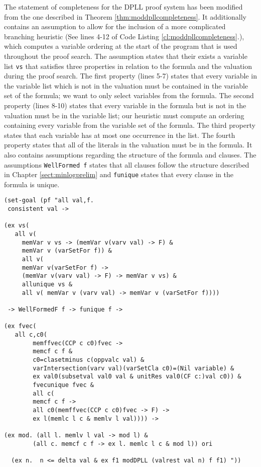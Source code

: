 The statement of completeness for the DPLL proof system has been modified from the one described in Theorem \ref{thm:moddpllcompleteness}. It additionally contains an assumption to allow for the inclusion of a more complicated branching heuristic (See lines 4-12 of Code Listing \ref{cl:moddpllcompleteness}.), which computes a variable ordering at the start of the program that is used throughout the proof search.  The assumption states that their exists a variable list \texttt{vs} that satisfies three properties in relation to the formula and the valuation during the proof search.  The first property (lines 5-7) states that every variable in the variable list which is not in the valuation must be contained in the variable set of the formula; we want to only select variables from the formula. The second property (lines 8-10) states that every variable in the formula but is not in the valuation must be in the variable list; our heuristic must compute an ordering containing every variable from the variable set of the formula. The third property states that each variable has at most one occurrence in the list. The fourth property states that all of the literals in the valuation must be in the formula. It also contains assumptions regarding the structure of the formula and clauses. The assumptions  \texttt{WellFormed f} states that all clauses follow the structure described in Chapter \ref{sect:minlogprelim} and \texttt{funique} states that every clause in the formula is unique.

\begin{lstlisting}[caption = The Completeness Theorem for the Modified DPLL Proof System in Minlog, label = cl:moddpllcompleteness]
(set-goal (pf "all val,f.  
 consistent val -> 
 
(ex vs(
   all v(
     memVar v vs -> (memVar v(varv val) -> F) & 
     memVar v (varSetFor f)) & 
     all v(
     memVar v(varSetFor f) -> 
     (memVar v(varv val) -> F) -> memVar v vs) & 
     allunique vs & 
     all v( memVar v (varv val) -> memVar v (varSetFor f))))
    
 -> WellFormedF f -> funique f ->

(ex fvec(
   all c,c0(
        memffvec(CCP c c0)fvec -> 
        memcf c f & 
        c0=clasetminus c(oppvalc val) & 
        varIntersection(varv val)(varSetCla c0)=(Nil variable) & 
        ex val0(subsetval val0 val & unitRes val0(CF c:)val c0)) & 
        fvecunique fvec &
        all c(
        memcf c f -> 
        all c0(memffvec(CCP c c0)fvec -> F) -> 
        ex l(memlc l c & memlv l val)))) ->

(ex mod. (all l. memlv l val -> mod l) & 
        (all c. memcf c f -> ex l. memlc l c & mod l)) ori 

  (ex n.  n <= delta val & ex f1 modDPLL (valrest val n) f f1) "))
\end{lstlisting}

